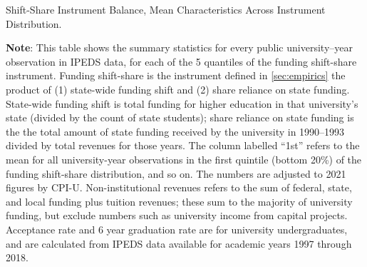 \begin{table}[H]
    \singlespacing
    \caption{Shift-Share Instrument Balance, Mean Characteristics Across Instrument Distribution.}
    \makebox[\textwidth][c]{}
    \label{tab:summary-quantiles}
    \justify
    \footnotesize
    \textbf{Note}:
    This table shows the summary statistics for every public university--year observation in IPEDS data, for each of the 5 quantiles of the funding shift-share instrument.
    Funding shift-share is the instrument defined in \autoref{sec:empirics} the product of (1) state-wide funding shift and (2) share reliance on state funding.
    State-wide funding shift is total funding for higher education in that university's state (divided by the count of state students); share reliance on state funding is the the total amount of state funding received by the university in 1990--1993 divided by total revenues for those years. 
    The column labelled ``1st'' refers to the mean for all university-year observations in the first quintile (bottom 20\%) of the funding shift-share distribution, and so on.
    The numbers are adjusted to 2021 figures by CPI-U.
    Non-institutional revenues refers to the sum of federal, state, and local funding plus tuition revenues; these sum to the majority of university funding, but exclude numbers such as university income from capital projects.
    Acceptance rate and 6 year graduation rate are for university undergraduates, and are calculated from IPEDS data available for academic years 1997 through 2018.
\end{table}

